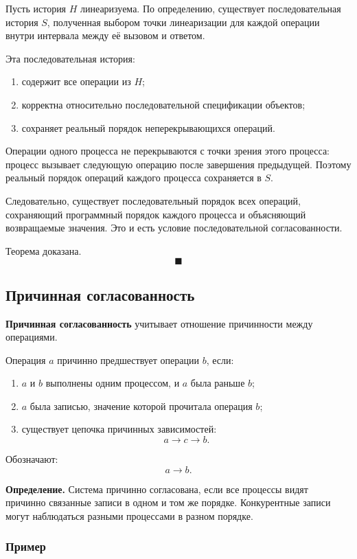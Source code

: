 \documentclass[12pt,a4paper]{article}
\begin{document}
Пусть история $H$ линеаризуема. По определению, существует последовательная история $S$, полученная выбором точки линеаризации для каждой операции внутри интервала между её вызовом и ответом.

Эта последовательная история:
\begin{enumerate}
    \item содержит все операции из $H$;
    \item корректна относительно последовательной спецификации объектов;
    \item сохраняет реальный порядок неперекрывающихся операций.
\end{enumerate}

Операции одного процесса не перекрываются с точки зрения этого процесса: процесс вызывает следующую операцию после завершения предыдущей. Поэтому реальный порядок операций каждого процесса сохраняется в $S$.

Следовательно, существует последовательный порядок всех операций, сохраняющий программный порядок каждого процесса и объясняющий возвращаемые значения. Это и есть условие последовательной согласованности.

Теорема доказана.
\[
\blacksquare
\]

\subsection{Причинная согласованность}

\textbf{Причинная согласованность} учитывает отношение причинности между операциями.

Операция $a$ причинно предшествует операции $b$, если:
\begin{enumerate}
    \item $a$ и $b$ выполнены одним процессом, и $a$ была раньше $b$;
    \item $a$ была записью, значение которой прочитала операция $b$;
    \item существует цепочка причинных зависимостей:
    \[
    a \rightarrow c \rightarrow b.
    \]
\end{enumerate}

Обозначают:
\[
a \rightarrow b.
\]

\textbf{Определение.}
Система причинно согласована, если все процессы видят причинно связанные записи в одном и том же порядке. Конкурентные записи могут наблюдаться разными процессами в разном порядке.

\subsubsection{Пример}
\end{document}
